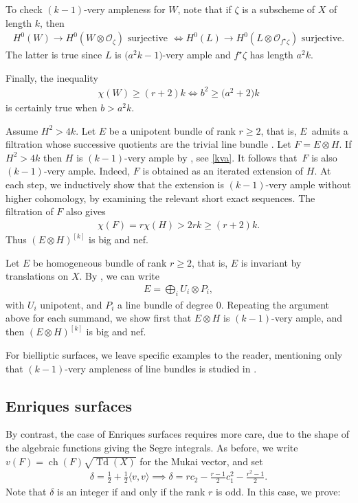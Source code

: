 \documentclass[pdftex]{sigma}
\numberwithin{equation}{section}
\begin{document}
\begin{Example}
To check $(k-1)$-very ampleness for $W$, note that if $\zeta$ is a subscheme of $X$ of length $k$, then \begin{gather*}
H^0(W)\to H^0(W\otimes\mathcal O_{\zeta}) \text{ surjective }\iff H^0(L)\to H^0(L\otimes \mathcal O_{f^{\star} \zeta}) \text { surjective}.
\end{gather*}
The latter is true since $L$ is $\big(a^2k-1\big)$-very ample and $f^{\star}\zeta$ has length $a^2k$.

Finally, the inequality
\begin{gather*}
\chi(W)\geq (r+2) k\iff b^2\geq \big(a^2+2\big)k
\end{gather*}
is certainly true when $b>a^2k$.
\end{Example}

\begin{Example} Assume $H^2>4k$. Let $E$ be a unipotent bundle of rank $r\geq 2$, that is, $E$~admits a filtration whose successive quotients are the trivial line bundle \cite[Definition~4.5]{M}. Let $F=E\otimes H$. If $H^2> 4k$ then $H$ is $(k-1)$-very ample by \cite[Theorem 2.1]{BS}, see \eqref{kva}. It follows that~$F$ is also $(k-1)$-very ample. Indeed, $F$ is obtained as an iterated extension of $H$. At each step, we inductively show that the extension is $(k-1)$-very ample without higher cohomology, by examining the relevant short exact sequences. The filtration of $F$ also gives
\begin{gather*}
\chi(F)=r\chi(H)> 2rk\geq (r+2)k.
\end{gather*}
Thus $(E\otimes H)^{[k]}$ is big and nef.

Let $E$ be homogeneous bundle of rank $r\geq 2$, that is, $E$ is invariant by translations on $X$. By \cite[Theorem 4.17]{M}, we can write
\begin{gather*}
E=\bigoplus_i U_i\otimes P_i,
\end{gather*}
with $U_i$ unipotent, and $P_i$ a line bundle of degree $0$. Repeating the argument above for each summand, we show first that $E\otimes H$ is $(k-1)$-very ample, and then $(E\otimes H)^{[k]}$ is big and nef.
\end{Example}

For bielliptic surfaces, we leave specific examples to the reader, mentioning only that $(k-1)$-very ampleness of line bundles is studied in \cite{MP}.

\subsection{Enriques surfaces} By contrast, the case of Enriques surfaces requires more care, due to the shape of the algebraic functions giving the Segre integrals. As before, we write $v(F)=\operatorname{ch}(F) \sqrt{\operatorname{Td}(X)}$ for the Mukai vector, and set
\begin{gather*}
\delta=\frac{1}{2}+\frac{1}{2}\langle v, v\rangle \implies \delta=rc_2-\frac{r-1}{2}c_1^2-\frac{r^2-1}{2}.
\end{gather*}
Note that $\delta$ is an integer if and only if the rank $r$ is odd. In this case, we prove:
\end{document}
